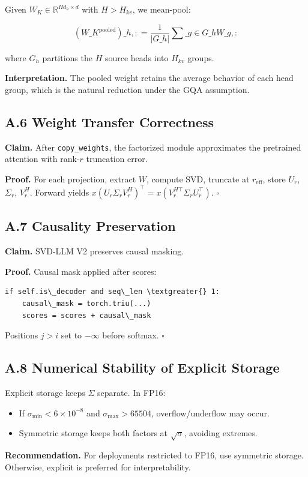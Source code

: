 Given $W_K \in \mathbb{R}^{H d_h \times d}$ with $H > H_{kv}$, we 
mean-pool:

\[
(W\_K^{\text{pooled}})\_{h, :} = \frac{1}{|G\_h|} \sum\_{g \in G\_h} W\_{g, :}
\tag{A.4}
\]

where $G_h$ partitions the $H$ source heads into $H_{kv}$ groups.

\textbf{Interpretation.} The pooled weight retains the average behavior of each 
head group, which is the natural reduction under the GQA assumption.

\subsection{A.6 Weight Transfer Correctness}

\textbf{Claim.} After \texttt{copy\_weights}, the factorized module approximates the 
pretrained attention with rank-$r$ truncation error.

\textbf{Proof.} For each projection, extract $W$, compute SVD, truncate at 
$r_\text{eff}$, store $U_r$, $\Sigma_r$, $V_r^H$. Forward yields 
$x (U_r \Sigma_r V_r^H)^\top = x (V_r^{H\top} \Sigma_r U_r^\top)$. $\square$

\subsection{A.7 Causality Preservation}

\textbf{Claim.} SVD-LLM V2 preserves causal masking.

\textbf{Proof.} Causal mask applied after scores:

\begin{lstlisting}
if self.is\_decoder and seq\_len \textgreater{} 1:
    causal\_mask = torch.triu(...)
    scores = scores + causal\_mask
\end{lstlisting}

Positions $j > i$ set to $-\infty$ before softmax. $\square$

\subsection{A.8 Numerical Stability of Explicit Storage}

Explicit storage keeps $\Sigma$ separate. In FP16:

\begin{itemize}
\item If $\sigma_\text{min} < 6 \times 10^{-8}$ and $\sigma_\text{max} > 65504$,
  overflow/underflow may occur.
\item Symmetric storage keeps both factors at $\sqrt{\sigma}$, avoiding
  extremes.

\end{itemize}
\textbf{Recommendation.} For deployments restricted to FP16, use symmetric 
storage. Otherwise, explicit is preferred for interpretability.

